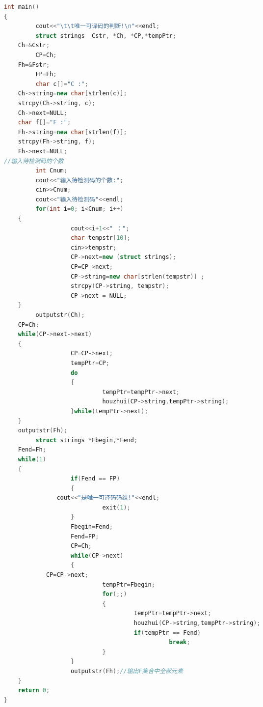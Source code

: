 \documentclass[12pt,a4paper]{article}
\begin{document}
\begin{CJK}{UTF8}{gbsn}
\begin{lstlisting}[language=C++]
int main()
{
         cout<<"\t\t唯一可译码的判断!\n"<<endl;
         struct strings  Cstr, *Ch, *CP,*tempPtr;   
    Ch=&Cstr;
         CP=Ch;
    Fh=&Fstr;
         FP=Fh;
         char c[]="C :";
    Ch->string=new char[strlen(c)];
    strcpy(Ch->string, c);      
    Ch->next=NULL;
    char f[]="F :";
    Fh->string=new char[strlen(f)];
    strcpy(Fh->string, f);
    Fh->next=NULL;
//输入待检测码的个数
         int Cnum;
         cout<<"输入待检测码的个数:";
         cin>>Cnum;
         cout<<"输入待检测码"<<endl;
         for(int i=0; i<Cnum; i++)
    {
                   cout<<i+1<<" ：";
                   char tempstr[10];
                   cin>>tempstr;  
                   CP->next=new (struct strings);
                   CP=CP->next;
                   CP->string=new char[strlen(tempstr)] ;
                   strcpy(CP->string, tempstr);
                   CP->next = NULL;
    }
         outputstr(Ch);
    CP=Ch;
    while(CP->next->next)
    {
                   CP=CP->next; 
                   tempPtr=CP;            
                   do
                   {
                            tempPtr=tempPtr->next;
                            houzhui(CP->string,tempPtr->string);
                   }while(tempPtr->next);
    }
    outputstr(Fh);
         struct strings *Fbegin,*Fend;
    Fend=Fh;
    while(1)
    {
                   if(Fend == FP)
                   {
               cout<<"是唯一可译码码组!"<<endl;
                            exit(1);
                   }
                   Fbegin=Fend;
                   Fend=FP;
                   CP=Ch;             
                   while(CP->next)
                   {
            CP=CP->next;
                            tempPtr=Fbegin;
                            for(;;)
                            {
                                     tempPtr=tempPtr->next;
                                     houzhui(CP->string,tempPtr->string);
                                     if(tempPtr == Fend)
                                               break;
                            }
                   }       
                   outputstr(Fh);//输出F集合中全部元素
    }
	return 0;
}



\end{lstlisting}


\end{CJK}
\end{document}
